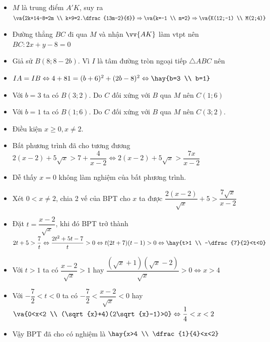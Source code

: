 \begin{itemize}[label=,leftmargin=*]
\item $M$ là trung điểm $A'K$, suy ra $\va{2k+14-8=2m \\ k+9=2.\dfrac{13m-2}{6}}\Rightarrow \va{k=-1 \\ m=2}\Rightarrow \va{K(12;-1) \\ M(2;4)}$
\item Đường thẳng $BC$ đi qua $M$ và nhận $\vv{AK}$ làm vtpt nên $BC:2x+y-8=0$
\item Giả sử $B(8;8-2b)$. Vì $I$ là tâm đường tròn ngoại tiếp $\triangle ABC$ nên
\item $IA=IB\Leftrightarrow 4+81=(b+6)^2+(2b-8)^2\Leftrightarrow \hay{b=3 \\ b=1}$
\item Với $b=3$ ta có $B(3;2)$. Do $C$ đối xứng với $B$ qua $M$ nên $C(1;6)$
\item Với $b=1$ ta có $B(1;6)$. Do $C$ đối xứng với $B$ qua $M$ nên $C(3;2)$. 
\end{itemize}

\lgi 
\begin{itemize}[label=,leftmargin=*]
\item Điều kiện $x\ge 0,x\ne 2$.
\item Bất phương trình đã cho tương đương $2(x-2)+5\sqrt{x} >7+\dfrac{4}{x-2}\Leftrightarrow 2(x-2)+5\sqrt{x}>\dfrac{7x}{x-2}$
\item Dễ thấy $x=0$ không làm nghiệm của bất phương trình.
\item Xét $0<x\ne 2$, chia 2 vế của BPT cho $x$ ta được $\dfrac{2(x-2)}{\sqrt{x}}+5 >\dfrac{7\sqrt{x}}{x-2}$
\item Đặt $t=\dfrac{x-2}{\sqrt{x}}$, khi đó BPT trở thành $2t+5>\dfrac{7}{t}\Leftrightarrow \dfrac{2t^2+5t-7}{t}>0 \Leftrightarrow t(2t+7)(t-1)>0\Leftrightarrow \hay{t>1 \\ -\dfrac{7}{2}<t<0}$
\item Với $t>1$ ta có $\dfrac{x-2}{\sqrt{x}}>1$ hay $\dfrac{(\sqrt{x}+1)(\sqrt{x}-2)}{\sqrt{x}}>0\Leftrightarrow x>4$
\item Với $-\dfrac{7}{2}<t<0$ ta có $-\dfrac{7}{2}<\dfrac{x-2}{\sqrt{x}}<0$ hay $\va{0<x<2 \\ (\sqrt{x}+4)(2\sqrt{x}-1)>0}\Leftrightarrow \dfrac{1}{4}<x<2$
\item Vậy BPT đã cho có nghiệm là $\hay{x>4 \\ \dfrac{1}{4}<x<2}$
\end{itemize}

